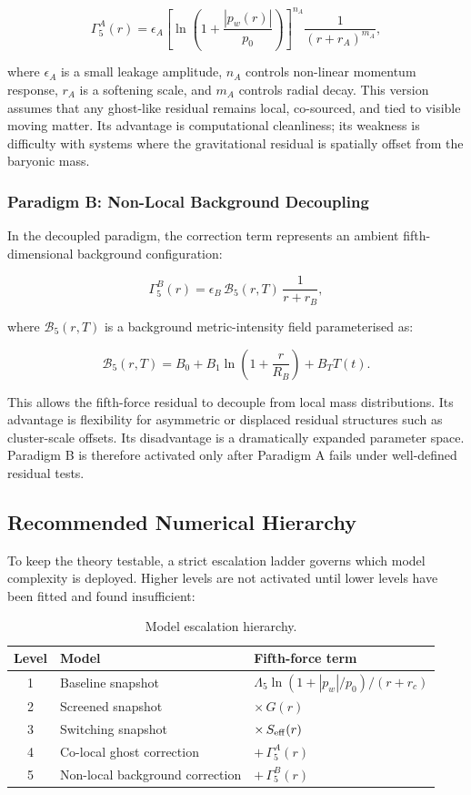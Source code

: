 \documentclass[11pt,a4paper]{article}
\newcommand{\pw}{p_w}                        %
\newcommand{\Lf}{\Lambda_5}                  %
\newcommand{\Seff}{S_{\rm eff}}              %
\newcommand{\Bfield}{\mathcal{B}_5}          %
\begin{document}
\[
  \Gamma_5^A(r) = \epsilon_A
  \left[\ln\!\left(1+\frac{|\pw(r)|}{p_0}\right)\right]^{n_A}
  \frac{1}{(r+r_A)^{m_A}} ,
\]

where $\epsilon_A$ is a small leakage amplitude, $n_A$ controls non-linear
momentum response, $r_A$ is a softening scale, and $m_A$ controls radial
decay.  This version assumes that any ghost-like residual remains local,
co-sourced, and tied to visible moving matter.  Its advantage is computational
cleanliness; its weakness is difficulty with systems where the gravitational
residual is spatially offset from the baryonic mass.

\subsubsection{Paradigm B: Non-Local Background Decoupling}

In the decoupled paradigm, the correction term represents an ambient
fifth-dimensional background configuration:

\[
  \Gamma_5^B(r) = \epsilon_B\,\Bfield(r,T)\,\frac{1}{r+r_B} ,
\]

where $\Bfield(r,T)$ is a background metric-intensity field parameterised as:

\[
  \Bfield(r,T) = B_0 + B_1\ln\!\left(1+\frac{r}{R_B}\right) + B_T T(t) .
\]

This allows the fifth-force residual to decouple from local mass distributions.
Its advantage is flexibility for asymmetric or displaced residual structures
such as cluster-scale offsets.  Its disadvantage is a dramatically expanded
parameter space.  Paradigm B is therefore activated only after Paradigm A
fails under well-defined residual tests.

\subsection{Recommended Numerical Hierarchy}\label{sec:hierarchy}

To keep the theory testable, a strict escalation ladder governs which model
complexity is deployed.  Higher levels are not activated until lower levels
have been fitted and found insufficient:

\begin{table}[H]
\centering
\caption{Model escalation hierarchy.}
\label{tab:hierarchy}
\begin{tabular}{@{}cll@{}}
\toprule
Level & Model & Fifth-force term \\
\midrule
1 & Baseline snapshot & $\Lf\ln(1+|\pw|/p_0)/(r+r_c)$ \\
2 & Screened snapshot & $\times\,G(r)$ \\
3 & Switching snapshot & $\times\,\Seff(r)$ \\
4 & Co-local ghost correction & $+\,\Gamma_5^A(r)$ \\
5 & Non-local background correction & $+\,\Gamma_5^B(r)$ \\
\bottomrule
\end{tabular}
\end{table}
\end{document}
